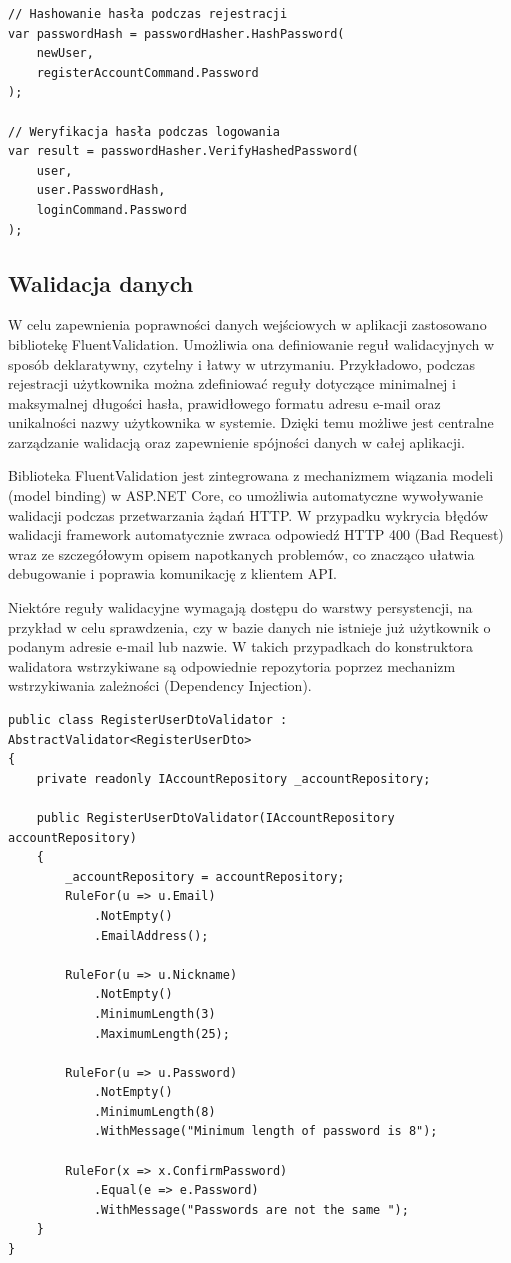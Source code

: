 \begin{lstlisting}[language={[Sharp]C}, caption={Hashowanie i weryfikacja hasła użytkownika}]
// Hashowanie hasła podczas rejestracji
var passwordHash = passwordHasher.HashPassword(
    newUser, 
    registerAccountCommand.Password
);

// Weryfikacja hasła podczas logowania
var result = passwordHasher.VerifyHashedPassword(
    user, 
    user.PasswordHash, 
    loginCommand.Password
);
\end{lstlisting}

\subsection{Walidacja danych}
    W celu zapewnienia poprawności danych wejściowych w aplikacji zastosowano bibliotekę FluentValidation. Umożliwia ona definiowanie reguł walidacyjnych w sposób deklaratywny, czytelny i łatwy w utrzymaniu. Przykładowo, podczas rejestracji użytkownika można zdefiniować reguły dotyczące minimalnej i maksymalnej długości hasła, prawidłowego formatu adresu e-mail oraz unikalności nazwy użytkownika w systemie. Dzięki temu możliwe jest centralne zarządzanie walidacją oraz zapewnienie spójności danych w całej aplikacji. 
    
    Biblioteka FluentValidation jest zintegrowana z mechanizmem wiązania modeli (model binding) w ASP.NET Core, co umożliwia automatyczne wywoływanie walidacji podczas przetwarzania żądań HTTP. W przypadku wykrycia błędów walidacji framework automatycznie zwraca odpowiedź HTTP 400 (Bad Request) wraz ze szczegółowym opisem napotkanych problemów, co znacząco ułatwia debugowanie i poprawia komunikację z klientem API.

    Niektóre reguły walidacyjne wymagają dostępu do warstwy persystencji, na przykład w celu sprawdzenia, czy w bazie danych nie istnieje już użytkownik o podanym adresie e-mail lub nazwie. W takich przypadkach do konstruktora walidatora wstrzykiwane są odpowiednie repozytoria poprzez mechanizm wstrzykiwania zależności (Dependency Injection). 

\begin{lstlisting}[language={[Sharp]C}, caption={Przykład walidacji danych użytkownika podczas rejestracji}, label={lst:fluent-validation}]
public class RegisterUserDtoValidator : AbstractValidator<RegisterUserDto>
{
    private readonly IAccountRepository _accountRepository;

    public RegisterUserDtoValidator(IAccountRepository accountRepository)
    {
        _accountRepository = accountRepository;
        RuleFor(u => u.Email)
            .NotEmpty()
            .EmailAddress();

        RuleFor(u => u.Nickname)
            .NotEmpty()
            .MinimumLength(3)
            .MaximumLength(25);

        RuleFor(u => u.Password)
            .NotEmpty()
            .MinimumLength(8)
            .WithMessage("Minimum length of password is 8");

        RuleFor(x => x.ConfirmPassword)
            .Equal(e => e.Password)
            .WithMessage("Passwords are not the same ");
    }
}
\end{lstlisting}



